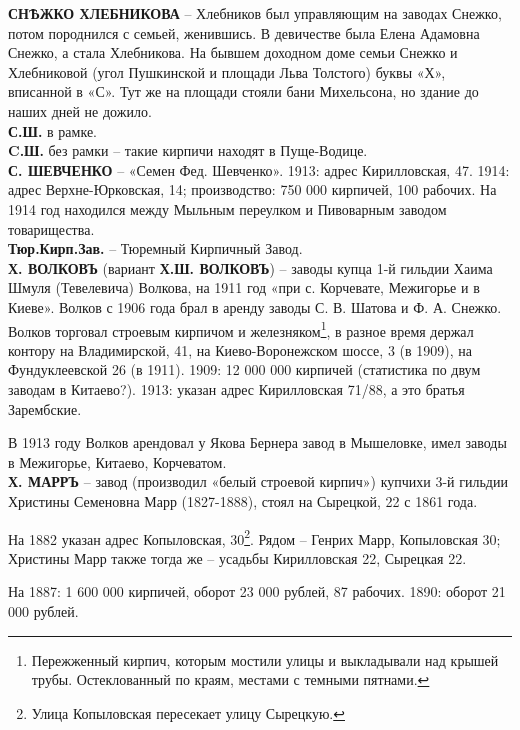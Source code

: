 \noindent\textbf{СНѢЖКО ХЛЕБНИКОВА} – Хлебников был управляющим на заводах Снежко, потом породнился с семьей, женившись. В девичестве была Елена Адамовна Снежко, а стала Хлебникова. На бывшем доходном доме семьи Снежко и Хлебниковой (угол Пушкинской и площади Льва Толстого) буквы «Х», вписанной в «С». Тут же на площади стояли бани Михельсона, но здание до наших дней не дожило.\\ 

\noindent\textbf{С.Ш.} в рамке.\\

\noindent\textbf{C.Ш.} без рамки – такие кирпичи находят в Пуще-Водице.\\

\noindent\textbf{С. ШЕВЧЕНКО} – «Семен Фед. Шевченко». 1913: адрес Кирилловская, 47. 1914: адрес Верхне-Юрковская, 14; производство: 750 000 кирпичей, 100 рабочих. На 1914 год находился между Мыльным переулком и Пивоварным заводом товарищества.\\

\noindent\textbf{Тюр.Кирп.Зав.} – Тюремный Кирпичный Завод.\\

\noindent\textbf{Х. ВОЛКОВЪ} (вариант \textbf{Х.Ш. ВОЛКОВЪ}) – заводы купца 1-й гильдии Хаима Шмуля (Тевелевича) Волкова, на 1911 год «при  с. Корчевате, Межигорье и в Киеве». Волков с 1906 года брал в аренду заводы С. В. Шатова и Ф. А. Снежко. Волков торговал строевым кирпичом и железняком\footnote{Пережженный кирпич, которым мостили улицы и выкладывали над крышей трубы. Остеклованный по краям, местами с темными пятнами.}, в разное время держал контору на Владимирской, 41, на Киево-Воронежском шоссе, 3 (в 1909), на Фундуклеевской 26 (в 1911). 1909: 12 000 000 кирпичей (статистика по двум заводам в Китаево?). 1913: указан адрес Кирилловская 71/88, а это братья Зарембские. 

В 1913 году Волков арендовал у Якова Бернера завод в Мышеловке, имел заводы в Межигорье, Китаево, Корчеватом.\\

\noindent\textbf{Х. МАРРЪ} – завод (производил «белый строевой кирпич») купчихи 3-й гильдии Христины Семеновна Марр (1827-1888), стоял на Сырецкой, 22 с 1861 года. 

На 1882 указан адрес Копыловская, 30\footnote{Улица Копыловская пересекает улицу Сырецкую.}. Рядом – Генрих Марр, Копыловская 30; Христины Марр также тогда же – усадьбы Кирилловская 22, Сырецкая 22. 

На 1887: 1 600 000 кирпичей, оборот 23 000 рублей, 87 рабочих. 1890: оборот 21 000 рублей.

